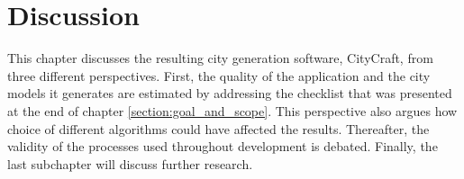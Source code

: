 \chapter{Discussion}

This chapter discusses the resulting city generation software, CityCraft, from three different perspectives.
First, the quality of the application and the city models it generates are estimated by addressing the checklist that was presented at the end of chapter \ref{section:goal_and_scope}.
This perspective also argues how choice of different algorithms could have affected the results.
Thereafter, the validity of the processes used throughout development is debated.
Finally, the last subchapter will discuss further research.





